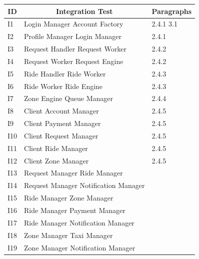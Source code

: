 \documentclass[a4paper,11pt]{report} %
\begin{document}
			\begin{center}
				\begin{tabular}{ l | p{7cm} | p{5cm} }\hline
					\multicolumn{1}{c|}{\textbf{ID}} & \multicolumn{1}{|c|}{\textbf{Integration Test}} & \textbf{Paragraphs}\\\hline
					 I1 & Login Manager \textrightarrow Account Factory & 2.4.1 \hspace{20pt} 3.1\\\hline
					 I2 & Profile Manager \textrightarrow Login Manager & 2.4.1\\\hline
					 I3 & Request Handler \textrightarrow Request Worker & 2.4.2\\\hline
					 I4 & Request Worker \textrightarrow Request Engine & 2.4.2\\\hline
					 I5 & Ride Handler \textrightarrow Ride Worker & 2.4.3\\\hline
					 I6 & Ride Worker \textrightarrow Ride Engine & 2.4.3\\\hline
					 I7 & Zone Engine \textrightarrow Queue Manager & 2.4.4\\\hline					 					 					 	
					 I8 & Client \textrightarrow Account Manager & 2.4.5\\\hline		
					 I9 & Client \textrightarrow Payment Manager & 2.4.5\\\hline					 					 					 	
					 I10 & Client \textrightarrow Request Manager & 2.4.5\\\hline					 					 				
					 I11 & Client \textrightarrow Ride Manager & 2.4.5\\\hline					 					 					 	
					 I12 & Client \textrightarrow Zone Manager & 2.4.5\\\hline					 					 					 	
					 I13 & Request Manager \textrightarrow Ride Manager & \\\hline		
					 I14 & Request Manager \textrightarrow Notification Manager & \\\hline					 					 					 					
					 I15 & Ride Manager \textrightarrow Zone Manager & \\\hline					 					 					 	
					 I16 & Ride Manager \textrightarrow Payment Manager & \\\hline					 	 			 				
					 I17 & Ride Manager \textrightarrow Notification Manager & \\\hline					 					 					 		 					 	
					 I18 & Zone Manager \textrightarrow Taxi Manager & \\\hline					 					 					 	
					 I19 & Zone Manager \textrightarrow Notification Manager & \\\hline					 					 					 	
					 					 					 					 					 	
					 					 			 					 					 	
				\end{tabular}
			\end{center}			
\end{document}

